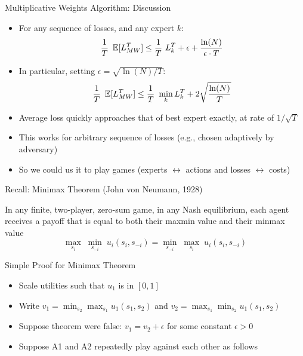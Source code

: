 \documentclass[11pt,aspectratio=169]{beamer}
\begin{document}
  
  \begin{frame}{Multiplicative Weights Algorithm: Discussion}
   \begin{itemize}[<+->]
    \item For any sequence of losses, and any expert $k$:
    $$\frac{1}{T}~\operatorname{\mathbb{E}}[L_{MW}^T] \leq \frac{1}{T}~L_k^T + \epsilon + \frac{\ln(N)}{\epsilon\cdot T}$$
    \item In particular, setting $\epsilon = \sqrt{\ln(N)/T}$:
    $$\frac{1}{T}~\operatorname{\mathbb{E}}[L_{MW}^T] \leq \frac{1}{T}~\min_k L_k^T + 2\sqrt{\frac{\ln(N)}{T}}$$
    \item Average loss quickly approaches that of best expert \alert{exactly}, at rate of $1/\sqrt{T}$
    \item This works for \alert{arbitrary} sequence of losses (e.g., chosen adaptively by adversary)
    \item So we could us it to play games (\alert{experts $\leftrightarrow$ actions} and \alert{losses $\leftrightarrow$ costs})
   \end{itemize}
  \end{frame}
  
  
  \begin{frame}{Recall: Minimax Theorem (John von Neumann, 1928)}
   \begin{center}
    In any finite, two-player, zero-sum game, in any Nash equilibrium\footnotemark{}, each agent receives a payoff that is equal to both their maxmin value and their minmax value
    $$\underset{s_i}{\max} \; \underset{s_{-i}}{\min} \; u_i(s_i,s_{-i}) = \underset{s_{-i}}{\min} \; \underset{s_{i}}{\max} \; u_{i}(s_i,s_{-i})$$
   \end{center}
  \end{frame}
  
  
  \begin{frame}{Simple Proof for Minimax Theorem}
   \begin{itemize}[<+->]
   \setlength{\itemsep}{1em}
    \item Scale utilities such that $u_1$ is in $[0, 1]$
    \item Write $v_1 = \min_{s_{2}} \max_{s_1} u_1(s_1,s_{2})$ and $v_2 = \max_{s_1} \min_{s_{2}} u_1(s_1,s_2)$
    \item Suppose theorem were false: $v_1 = v_2 + \epsilon$ for some constant $\epsilon > 0$
    \item Suppose A1 and A2 repeatedly play against each other as follows
   \end{itemize}
  \end{frame}
  
\end{document}
